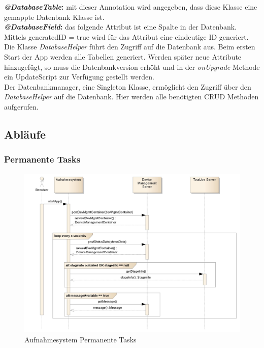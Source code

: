 \textbf{\textit{@DatabaseTable}:} mit dieser Annotation wird angegeben, dass diese Klasse eine gemappte Datenbank Klasse ist.\\
\textbf{\textit{@DatabaseField}:} das folgende Attribut ist eine Spalte in der Datenbank. Mittels generatedID = true wird für das Attribut eine eindeutige ID generiert.\\

Die Klasse \textit{DatabaseHelper} führt den Zugriff auf die Datenbank aus. Beim ersten Start der App werden alle Tabellen generiert. Werden später neue Attribute hinzugefügt, so muss die Datenbankversion erhöht und in der \textit{onUpgrade} Methode ein UpdateScript zur Verfügung gestellt werden.\\

Der Datenbankmanager, eine Singleton Klasse, ermöglicht den Zugriff über den \textit{DatabaseHelper} auf die Datenbank. Hier werden alle benötigten CRUD Methoden aufgerufen.

\subsection{Abläufe}

\subsubsection{Permanente Tasks}
\begin{figure}[H]
	\centering
	\includegraphics[width=150mm]{images/android/permanent_taskes.jpg}
	\caption{Aufnahmesystem Permanente Tasks}
\end{figure}

